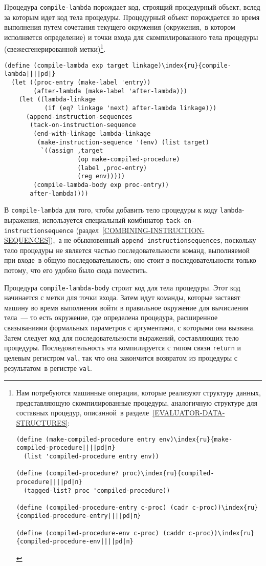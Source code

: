 Процедура {\tt compile-lambda} порождает код,
строящий процедурный объект, вслед за которым идет код тела
процедуры.  Процедурный объект порождается во время выполнения путем
сочетания текущего окружения (окружения,~в котором исполняется
определение) и точки входа для скомпилированного тела процедуры
(свежесгенерированной метки)\footnote{\label{F5.38}
Нам потребуются машинные операции, которые реализуют
структуру данных, представляющую скомпилированные процедуры,
аналогичную структуре для составных процедур, описанной~в 
разделе~\ref{EVALUATOR-DATA-STRUCTURES}:

\begin{Verbatim}
(define (make-compiled-procedure entry env)\index{ru}{make-compiled-procedure||||pd|п}
  (list 'compiled-procedure entry env))

(define (compiled-procedure? proc)\index{ru}{compiled-procedure||||pd|п}
  (tagged-list? proc 'compiled-procedure))

(define (compiled-procedure-entry c-proc) (cadr c-proc))\index{ru}{compiled-procedure-entry||||pd|п}

(define (compiled-procedure-env c-proc) (caddr c-proc))\index{ru}{compiled-procedure-env||||pd|п}
\end{Verbatim}
}.%

\begin{Verbatim}[fontsize=\small]
(define (compile-lambda exp target linkage)\index{ru}{compile-lambda||||pd|}
  (let ((proc-entry (make-label 'entry))
        (after-lambda (make-label 'after-lambda)))
    (let ((lambda-linkage
           (if (eq? linkage 'next) after-lambda linkage)))
      (append-instruction-sequences
       (tack-on-instruction-sequence
        (end-with-linkage lambda-linkage
         (make-instruction-sequence '(env) (list target)
          `((assign ,target
                    (op make-compiled-procedure)
                    (label ,proc-entry)
                    (reg env)))))
        (compile-lambda-body exp proc-entry))
       after-lambda))))
\end{Verbatim}
В {\tt compile-lambda} для того, чтобы добавить тело процедуры
к коду {\tt lambda}-выражения, используется специальный комбинатор
{\tt tack-on-instruction\-sequence} 
(раздел~\ref{COMBINING-INSTRUCTION-SEQUENCES}),~а не
обыкновенный {\tt append-instruction\-sequences}, поскольку тело
процедуры не является частью последовательности команд, выполняемой
при входе~в общую последовательность; оно стоит в
последовательности только потому, что его удобно было сюда
поместить.
{\sloppy

}
Процедура {\tt compile-lambda-body} строит код для
тела процедуры.  Этот код начинается с метки для точки входа.  Затем
идут команды, которые заставят машину во время выполнения войти в
правильное окружение для вычисления тела~--- то есть окружение,
где определена процедура, расширенное связываниями формальных
параметров с аргументами, с которыми она вызвана. Затем следует
код для последовательности выражений, составляющих тело процедуры.
Последовательность эта компилируется с типом связи {\tt return}
и целевым регистром {\tt val}, так что она закончится возвратом
из процедуры с результатом~в регистре {\tt val}.

